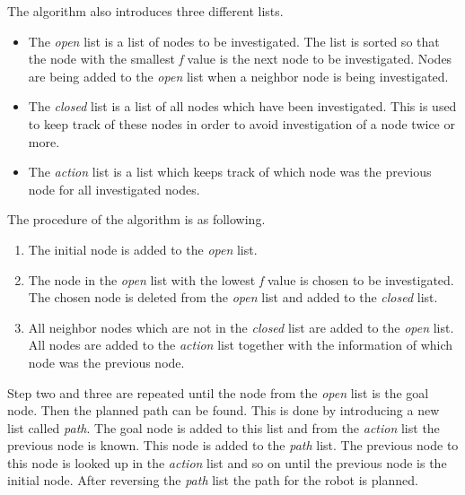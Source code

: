 The algorithm also introduces three different lists.

\begin{itemize}
	\item The \emph{open} list is a list of nodes to be investigated. The list is sorted so that the node with the smallest \emph{f} value is the next node to be investigated. Nodes are being added to the \emph{open} list when a neighbor node is being investigated.

	\item The \emph{closed} list is a list of all nodes which have been investigated. This is used to keep track of these nodes in order to avoid investigation of a node twice or more.

	\item The \emph{action} list is a list which keeps track of which node was the previous node for all investigated nodes.\\
\end{itemize}

The procedure of the algorithm is as following. 

\begin{enumerate}
  \item The initial node is added to the \emph{open} list.

  \item The node in the \emph{open} list with the lowest \emph{f} value is chosen to be investigated. The chosen node is deleted from the \emph{open} list and added to the \emph{closed} list. 

  \item All neighbor nodes which are not in the \emph{closed} list are added to the \emph{open} list. All nodes are added to the \emph{action} list together with the information of which node was the previous node.
\end{enumerate}

Step two and three are repeated until the node from the \emph{open} list is the goal node. Then the planned path can be found. This is done by introducing a new list called \emph{path}. The goal node is added to this list and from the \emph{action} list the previous node is known. This node is added to the \emph{path} list. The previous node to this node is looked up in the \emph{action} list and so on until the previous node is the initial node. After reversing the \emph{path} list the path for the robot is planned. \\


